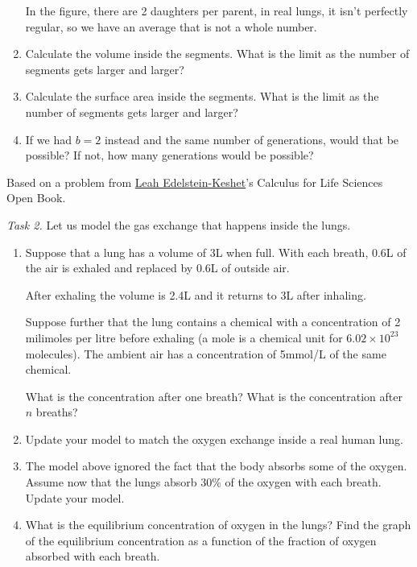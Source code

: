 \begin{enumerate}[label=\emph{(\alph*)}]
		In the figure, there are 2 daughters per parent, in 	real lungs, it isn't perfectly regular, so we have an average that is not a whole number.
		
		
		
	\item Calculate the volume inside the segments. What is the limit as the number of segments gets larger and larger?
	\item Calculate the surface area inside the segments. What is the limit as the number of segments gets larger and larger?

	\item If we had $b=2$ instead and the same number of generations, would that be possible? If not, how many generations would be possible?
\end{enumerate}

\vfill

\begin{graybox}
Based on a problem from \href{http://www.math.ubc.ca/~keshet/keshet.html}{Leah Edelstein-Keshet}'s Calculus for Life Sciences Open Book.
\end{graybox}


\newpage
\emph{Task 2. } Let us model the gas exchange that happens inside the lungs.
\begin{enumerate}[label=\emph{(\alph*)}]
\item Suppose that a lung has a volume of 3L when full. With each breath, 0.6L of the air is exhaled and replaced by 0.6L of outside air.

	After exhaling the volume is 2.4L and it returns to 3L after inhaling.
	
	Suppose further that the lung contains a chemical with a concentration of 2 milimoles per litre before exhaling (a mole is a chemical unit for $6.02 \times 10^{23}$ molecules). The ambient air has a concentration of 5mmol/L of the same chemical.

	What is the concentration after one breath? What is the concentration after $n$ breaths?

\item Update your model to match the oxygen exchange inside a real human lung.
	
\item The model above ignored the fact that the body absorbs some of the oxygen. Assume now that the lungs absorb 30\% of the oxygen with each breath. Update your model.

\item What is the equilibrium concentration of oxygen in the lungs? Find the graph of the equilibrium concentration as a function of the fraction of oxygen absorbed with each breath.

\end{enumerate}

